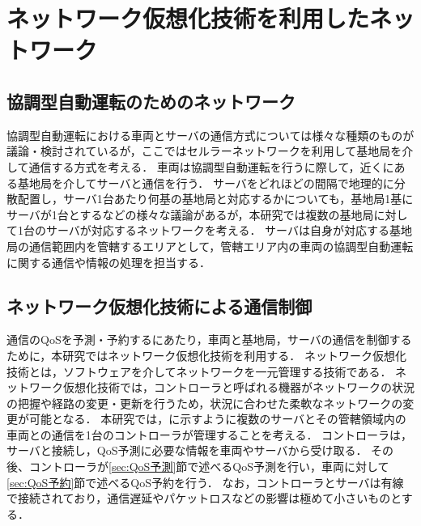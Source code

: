 \documentclass[a4paper,11pt,uplatex]{ujreport}
\begin{document}
\section{ネットワーク仮想化技術を利用したネットワーク}
\label{sec:ネットワーク仮想化技術を利用したネットワーク}

\subsection{協調型自動運転のためのネットワーク}

協調型自動運転における車両とサーバの通信方式については様々な種類のものが議論・検討されているが，ここではセルラーネットワークを利用して基地局を介して通信する方式を考える．
車両は協調型自動運転を行うに際して，近くにある基地局を介してサーバと通信を行う．
サーバをどれほどの間隔で地理的に分散配置し，サーバ1台あたり何基の基地局と対応するかについても，基地局1基にサーバが1台とするなどの様々な議論があるが，本研究では複数の基地局に対して1台のサーバが対応するネットワークを考える．
サーバは自身が対応する基地局の通信範囲内を管轄するエリアとして，管轄エリア内の車両の協調型自動運転に関する通信や情報の処理を担当する．

\subsection{ネットワーク仮想化技術による通信制御}
\label{ネットワーク仮想化技術による通信制御}

通信のQoSを予測・予約するにあたり，車両と基地局，サーバの通信を制御するために，本研究ではネットワーク仮想化技術を利用する．
ネットワーク仮想化技術とは，ソフトウェアを介してネットワークを一元管理する技術である．
ネットワーク仮想化技術では，コントローラと呼ばれる機器がネットワークの状況の把握や経路の変更・更新を行うため，状況に合わせた柔軟なネットワークの変更が可能となる．
本研究では，に示すように複数のサーバとその管轄領域内の車両との通信を1台のコントローラが管理することを考える．
コントローラは，サーバと接続し，QoS予測に必要な情報を車両やサーバから受け取る．
その後、コントローラが\ref{sec:QoS予測}節で述べるQoS予測を行い，車両に対して\ref{sec:QoS予約}節で述べるQoS予約を行う．
なお，コントローラとサーバは有線で接続されており，通信遅延やパケットロスなどの影響は極めて小さいものとする．\par
\end{document}
